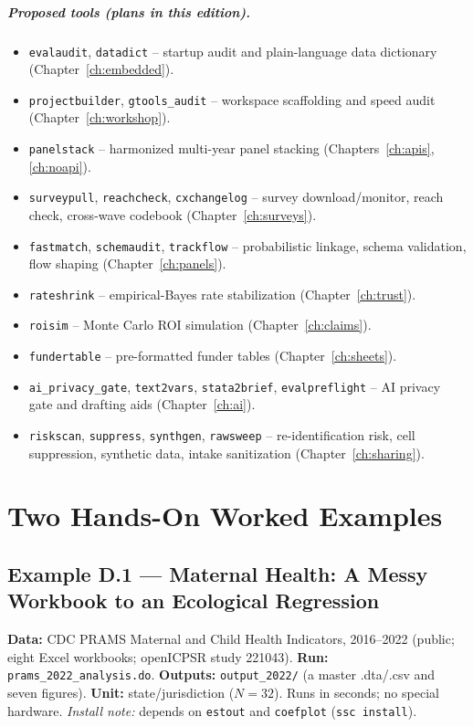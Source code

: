 \documentclass[
    a4paper,
    fontsize=10pt,
    twoside=true,
    numbers=noenddot,
]{kaobook}
\providecommand{\Option}[1]{\textsf{#1}}
\begin{document}
\paragraph{Proposed tools (plans in this edition).}
\begin{itemize}
    \item \texttt{evalaudit}, \texttt{datadict} -- startup audit and plain-language data dictionary (Chapter~\ref{ch:embedded}).
    \item \texttt{projectbuilder}, \texttt{gtools\_audit} -- workspace scaffolding and speed audit (Chapter~\ref{ch:workshop}).
    \item \texttt{panelstack} -- harmonized multi-year panel stacking (Chapters~\ref{ch:apis}, \ref{ch:noapi}).
    \item \texttt{surveypull}, \texttt{reachcheck}, \texttt{cxchangelog} -- survey download/monitor, reach check, cross-wave codebook (Chapter~\ref{ch:surveys}).
    \item \texttt{fastmatch}, \texttt{schemaudit}, \texttt{trackflow} -- probabilistic linkage, schema validation, flow shaping (Chapter~\ref{ch:panels}).
    \item \texttt{rateshrink} -- empirical-Bayes rate stabilization (Chapter~\ref{ch:trust}).
    \item \texttt{roisim} -- Monte Carlo ROI simulation (Chapter~\ref{ch:claims}).
    \item \texttt{fundertable} -- pre-formatted funder tables (Chapter~\ref{ch:sheets}).
    \item \texttt{ai\_privacy\_gate}, \texttt{text2vars}, \texttt{stata2brief}, \texttt{evalpreflight} -- AI privacy gate and drafting aids (Chapter~\ref{ch:ai}).
    \item \texttt{riskscan}, \texttt{suppress}, \texttt{synthgen}, \texttt{rawsweep} -- re-identification risk, cell suppression, synthetic data, intake sanitization (Chapter~\ref{ch:sharing}).
\end{itemize}

\chapter{Two Hands-On Worked Examples}\label{app:walkthroughs}

\section*{Example D.1 --- Maternal Health: A Messy Workbook to an Ecological Regression}
\begin{kaobox}[frametitle=Get the files: \texttt{221043-V2/}]
\textbf{Data:} CDC PRAMS Maternal and Child Health Indicators, 2016--2022 (public; eight Excel workbooks; openICPSR study 221043).
\textbf{Run:} \texttt{prams\_2022\_analysis.do}. \textbf{Outputs:} \texttt{output\_2022/} (a master \Option{.dta}/\Option{.csv} and seven figures).
\textbf{Unit:} state/jurisdiction ($N=32$). Runs in seconds; no special hardware. \emph{Install note:} depends on \texttt{estout} and \texttt{coefplot} (\texttt{ssc install}).
\end{kaobox}
\end{document}
